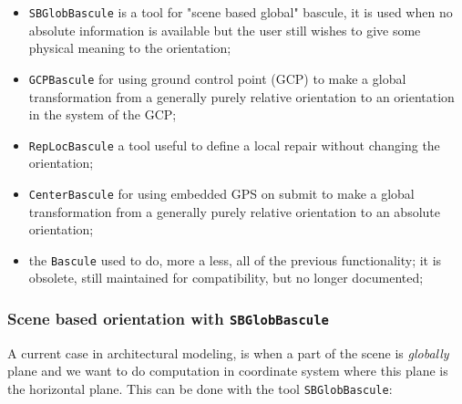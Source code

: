 \begin{itemize}

   \item {\tt SBGlobBascule}  is a tool for "scene based global" bascule,
         it is used when no absolute information is available but the user
         still wishes to give some physical meaning to the orientation;

   \item {\tt GCPBascule}  for using ground control point (GCP) to make
         a global transformation from a generally purely relative orientation
         to an orientation in the system of the GCP;

   \item {\tt RepLocBascule} a tool useful to define a local repair without
         changing the orientation;

   \item {\tt CenterBascule}  for using embedded GPS on submit  to make
         a global transformation from a generally purely relative orientation
         to an absolute orientation;

   \item   the {\tt Bascule} used to do, more a less, all of the previous
           functionality; it is obsolete, still maintained for compatibility,
           but no longer documented;
\end{itemize}


\subsubsection{Scene based orientation with {\tt SBGlobBascule}}

\label{ScBas:Basc}

A current case in architectural modeling, is when a part of the
scene is \emph{globally} plane and we want to do computation in
coordinate system where this plane is the horizontal plane.
This can be done with the tool {\tt SBGlobBascule}:



